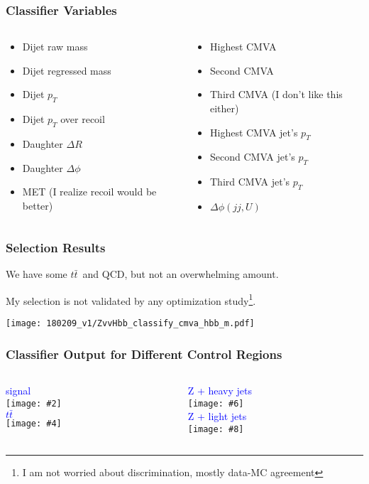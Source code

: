 \documentclass{beamer}
\newcommand{\fourfigs}[8]{
  \begin{columns}
    \begin{column}{0.3\linewidth}
      \centering
      \textcolor{blue}{#1} \\
      \texttt{[image: \#2]} \\
      \textcolor{blue}{#3} \\
      \texttt{[image: \#4]}
    \end{column}
    \begin{column}{0.3\linewidth}
      \centering
      \textcolor{blue}{#5} \\
      \texttt{[image: \#6]} \\
      \textcolor{blue}{#7} \\
      \texttt{[image: \#8]}
    \end{column}
  \end{columns}
}
\newcommand{\ttbar}{\ensuremath{t\bar{t}}}
\begin{document}
\begin{frame}
  \frametitle{Classifier Variables}
  \begin{columns}
    \begin{column}{0.5\linewidth}
      \begin{itemize}
      \item Dijet raw mass
      \item Dijet regressed mass
      \item Dijet $p_T$
      \item Dijet $p_T$ over recoil
      \item Daughter $\Delta R$
      \item Daughter $\Delta \phi$
      \item MET (I realize recoil would be better)
      \end{itemize}
    \end{column}
    \begin{column}{0.5\linewidth}
      \begin{itemize}
      \item Highest CMVA
      \item Second CMVA
      \item Third CMVA (I don't like this either)
      \item Highest CMVA jet's $p_T$
      \item Second CMVA jet's $p_T$
      \item Third CMVA jet's $p_T$
      \item $\Delta \phi (jj, U)$
      \end{itemize}
    \end{column}
  \end{columns}
\end{frame}

\begin{frame}
  \frametitle{Selection Results}
  We have some \ttbar~and QCD, but not an overwhelming amount.

  My selection is not validated by any optimization study\footnote{
    I am not worried about discrimination, mostly data-MC agreement}.

  \centering
  \texttt{[image: 180209\_v1/ZvvHbb\_classify\_cmva\_hbb\_m.pdf]}

\end{frame}

\begin{frame}
  \frametitle{Classifier Output for Different Control Regions}

  \fourfigs{signal}
           {180209_v1/quick_signal_event_class.pdf}
           {\ttbar}
           {180209_v1/quick_tt_event_class.pdf}
           {Z + heavy jets}
           {180209_v1/quick_heavyz_event_class.pdf}
           {Z + light jets}
           {180209_v1/quick_lightz_event_class.pdf}

\end{frame}
\end{document}
